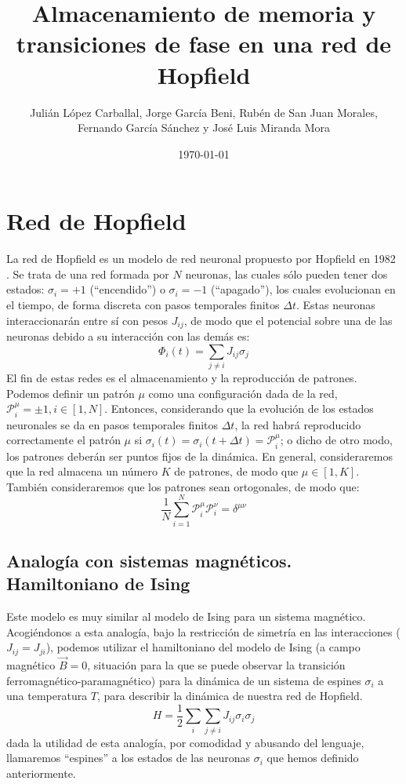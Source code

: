 \documentclass[titlepage,12pt]{article}
\title{\textbf{Almacenamiento de memoria y transiciones de fase en una red de Hopfield}}
\author{Julián López Carballal, Jorge García Beni, Rubén de San Juan Morales, Fernando García Sánchez y José Luis Miranda Mora}
\date{\today}
\numberwithin{equation}{section}
\begin{document}
	\maketitle
	\fontsize{15pt}{0}\tableofcontents
	\newpage
	
	
	\section{Red de Hopfield}
	\fontsize{12pt}{0}
	La red de Hopfield es un modelo de red neuronal propuesto por Hopfield en 1982 \cite{hopfield82}. Se trata de una red formada por $N$ neuronas, las cuales sólo pueden tener dos estados: $\sigma_i = +1$ (``encendido'') o $\sigma_i=-1$ (``apagado''), los cuales evolucionan en el tiempo, de forma discreta con pasos temporales finitos $\Delta t$. Estas neuronas interaccionarán entre sí con pesos $J_{ij}$, de modo que el potencial sobre una de las neuronas debido a su interacción con las demás es:
	\begin{displaymath}
	\Phi_i(t)=\sum_{j\neq i} J_{ij}\sigma_j
	\end{displaymath}
	El fin de estas redes es el almacenamiento y la reproducción de patrones. Podemos definir un patrón $\mu$ como una configuración dada de la red, $\mathcal{P}^\mu_i = \pm1, i \in[1,N]$. Entonces, considerando que la evolución de los estados neuronales se da en pasos temporales finitos $\Delta t$, la red habrá reproducido correctamente el patrón $\mu$ si $\sigma_i(t)=\sigma_i(t+\Delta t)=\mathcal{P}^\mu_i$; o dicho de otro modo, los patrones deberán ser puntos fijos de la dinámica. En general, consideraremos que la red almacena un número $K$ de patrones, de modo que $\mu\in[1,K]$. También consideraremos que los patrones sean ortogonales, de modo que:
	\begin{equation} \label{ortogonal}
	\frac{1}{N}\sum_{i=1}^N \mathcal{P}^\mu_i \mathcal{P}^\nu_i = \delta^{\mu\nu}
	\label{ortpat}
	\end{equation}
	\subsection{Analogía con sistemas magnéticos. Hamiltoniano de Ising}
	Este modelo es muy similar al modelo de Ising para un sistema magnético. Acogiéndonos a esta analogía, bajo la restricción de simetría en las interacciones ($J_{ij}=J_{ji}$), podemos utilizar el hamiltoniano del modelo de Ising (a campo magnético $\vec{B}=0$, situación para la que se puede observar la transición ferromagnético-paramagnético) para la dinámica de un sistema de espines $\sigma_i$ a una temperatura $T$, para describir la dinámica de nuestra red de Hopfield.
	\begin{equation}
	H = \frac{1}{2}\sum_{i}\sum_{j\neq i}J_{ij}\sigma_i\sigma_j
	\label{HIsing}
	\end{equation}
	dada la utilidad de esta analogía, por comodidad y abusando del lenguaje, llamaremos ``espines'' a los estados de las neuronas $\sigma_i$ que hemos definido anteriormente. 
\end{document}
